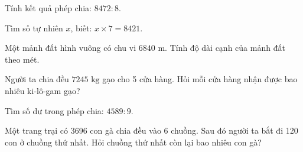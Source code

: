 \begin{ex} %
Tính kết quả phép chia: $8472 : 8$.
\end{ex}

\begin{ex} %
Tìm số tự nhiên $x$, biết: $x \times 7 = 8421$.
\end{ex}

\begin{ex} %
Một mảnh đất hình vuông có chu vi $6840\text{ m}$. Tính độ dài cạnh của mảnh đất theo mét.
\end{ex}

\begin{ex} %
Người ta chia đều $7245\text{ kg}$ gạo cho 5 cửa hàng. Hỏi mỗi cửa hàng nhận được bao nhiêu ki-lô-gam gạo?
\end{ex}

\begin{ex} %
Tìm số dư trong phép chia: $4589 : 9$.
\end{ex}

\begin{ex} %
Một trang trại có 3696 con gà chia đều vào 6 chuồng. Sau đó người ta bắt đi 120 con ở chuồng thứ nhất. Hỏi chuồng thứ nhất còn lại bao nhiêu con gà?
\end{ex}
